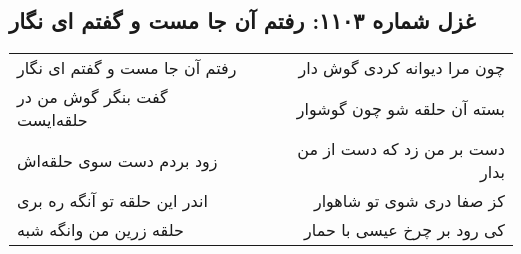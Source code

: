 \begin{center}
\section*{غزل شماره ۱۱۰۳: رفتم آن جا مست و گفتم ای نگار}
\label{sec:1103}
\begin{longtable}{l p{0.5cm} r}
رفتم آن جا مست و گفتم ای نگار
&&
چون مرا دیوانه کردی گوش دار
\\
گفت بنگر گوش من در حلقه‌ایست
&&
بسته آن حلقه شو چون گوشوار
\\
زود بردم دست سوی حلقه‌اش
&&
دست بر من زد که دست از من بدار
\\
اندر این حلقه تو آنگه ره بری
&&
کز صفا دری شوی تو شاهوار
\\
حلقه زرین من وانگه شبه
&&
کی رود بر چرخ عیسی با حمار
\\
\end{longtable}
\end{center}
